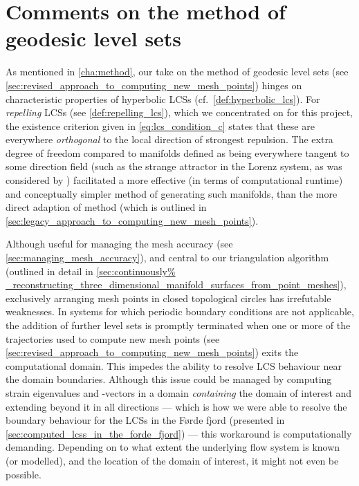 \section{Comments on the method of geodesic level sets}
\label{sec:comments_on_the_method_of_geodesic_level_sets}
%
As mentioned in \cref{cha:method}, our take on the method of geodesic level
sets (see \cref{sec:revised_approach_to_computing_new_mesh_points}) hinges on
characteristic properties of hyperbolic LCSs (cf.\ \cref{def:hyperbolic_lcs}).
For \emph{repelling} LCSs (see \cref{def:repelling_lcs}), which we concentrated
on for this project, the existence criterion given in \cref{eq:lcs_condition_c}
states that these are everywhere \emph{orthogonal} to the local direction of
strongest repulsion. The extra degree of freedom compared to manifolds defined
as being everywhere tangent to some direction field (such as the strange
attractor in the Lorenz system, as was considered by
\textcite{krauskopf2005survey}) facilitated a more effective (in terms of
computational runtime) and conceptually simpler method of generating such
manifolds, than the more direct adaption of 
method (which is outlined in
\cref{sec:legacy_approach_to_computing_new_mesh_points}).

Although useful for managing the mesh accuracy (see
\cref{sec:managing_mesh_accuracy}), and central to our
triangulation algorithm (outlined in detail in \cref{sec:continuously%
_reconstructing_three_dimensional_manifold_surfaces_from_point_meshes}),
exclusively arranging mesh points in closed topological circles has irrefutable
weaknesses. In systems for which periodic boundary conditions are not
applicable, the addition of further level sets is promptly terminated when one
or more of the trajectories used to compute new mesh points (see
\cref{sec:revised_approach_to_computing_new_mesh_points}) exits the
computational domain. This impedes the ability to resolve LCS behaviour near
the domain boundaries. Although this issue could be managed by computing strain
eigenvalues and -vectors in a domain \emph{containing} the domain of interest
and extending beyond it in all directions --- which is how we were able to
resolve the boundary behaviour for the LCSs in the Førde fjord (presented in
\cref{sec:computed_lcss_in_the_forde_fjord}) --- this workaround is
computationally demanding. Depending on to what extent the underlying flow
system is known (or modelled), and the location of the domain of interest, it
might not even be possible.

